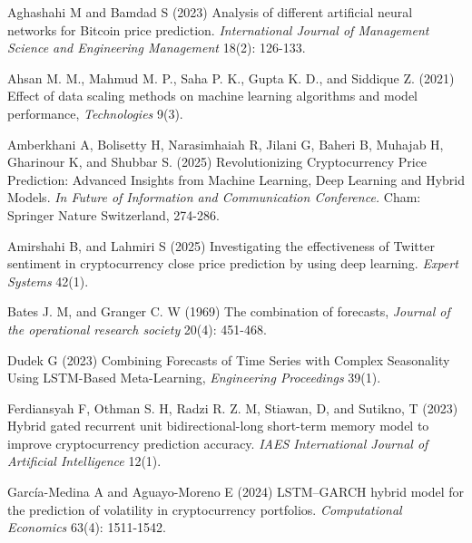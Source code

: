\documentclass{dsfe}
\begin{document}
\begin{thebibliography}{999}

\newblock Aghashahi M and Bamdad S (2023)
\newblock Analysis of different artificial neural networks for Bitcoin price prediction. 
\newblock \emph{International Journal of Management Science and Engineering Management} 18(2): 126-133.

\newblock Ahsan M. M., Mahmud M. P., Saha P. K., Gupta K. D., and Siddique Z. (2021) 
\newblock Effect of data scaling methods on machine learning algorithms and model performance, \newblock \emph{Technologies} 9(3).

\newblock Amberkhani A, Bolisetty H, Narasimhaiah R, Jilani G, Baheri B, Muhajab H, Gharinour K,  and Shubbar S. (2025)
\newblock  Revolutionizing Cryptocurrency Price Prediction: Advanced Insights from Machine Learning, Deep Learning and Hybrid Models.
\newblock \emph{ In Future of Information and Communication Conference.}
\newblock Cham: Springer Nature Switzerland, 274-286.

\newblock Amirshahi B, and Lahmiri S (2025)
\newblock Investigating the effectiveness of Twitter sentiment in cryptocurrency close price prediction by using deep learning.
\newblock \emph{Expert Systems} 42(1).

\newblock Bates J. M, and Granger C. W (1969) The combination of forecasts,
\newblock \emph{Journal of the operational research society} 20(4): 451-468.

\newblock Dudek G (2023) Combining Forecasts of Time Series with Complex Seasonality Using LSTM-Based Meta-Learning,
\newblock \emph{Engineering Proceedings} 39(1).

\newblock Ferdiansyah F, Othman S. H, Radzi R. Z. M, Stiawan, D, and Sutikno, T (2023)
\newblock Hybrid gated recurrent unit bidirectional-long short-term memory model to improve cryptocurrency prediction accuracy.
\newblock \emph{ IAES International Journal of Artificial Intelligence} 12(1).

\newblock García-Medina A and Aguayo-Moreno E (2024)
\newblock LSTM–GARCH hybrid model for the prediction of volatility in cryptocurrency portfolios. 
\newblock \emph{Computational Economics} 63(4): 1511-1542.


\end{thebibliography}
\end{document}
